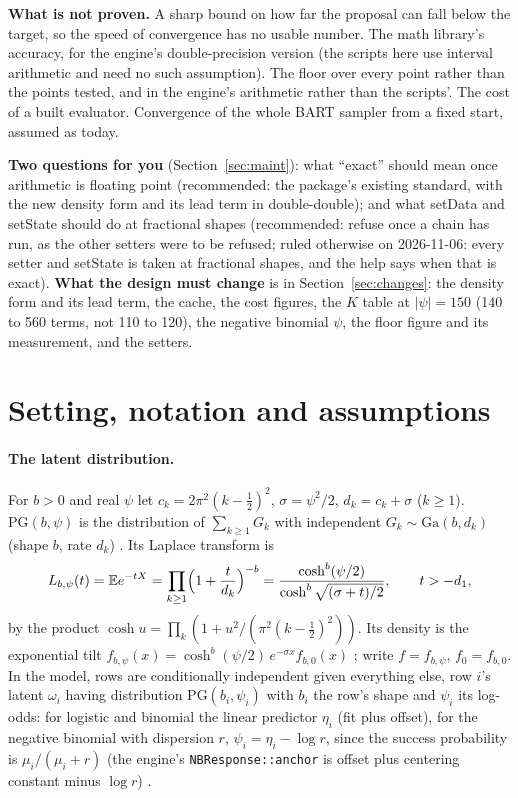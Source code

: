 \documentclass[11pt]{article}
\theoremstyle{definition}
\newcommand{\PG}{\mathrm{PG}}
\newcommand{\Ga}{\mathrm{Ga}}
\newcommand{\E}{\mathbb{E}}
\newcommand{\fz}{f_0}
\begin{document}
\textbf{What is not proven.} A sharp bound on how far the proposal can fall below the target, so the speed of
convergence has no usable number. The math library's accuracy, for the engine's double-precision version (the
scripts here use interval arithmetic and need no such assumption). The floor over every point rather than the
points tested, and in the engine's arithmetic rather than the scripts'. The cost of a built evaluator. Convergence
of the whole BART sampler from a fixed start, assumed as today.

\textbf{Two questions for you} (Section~\ref{sec:maint}): what ``exact'' should mean once arithmetic is floating
point (recommended: the package's existing standard, with the new density form and its lead term in
double-double); and what setData and setState should do at fractional shapes (recommended: refuse once a chain has
run, as the other setters were to be refused; ruled otherwise on 2026-11-06: every setter and setState is taken at
fractional shapes, and the help says when that is exact). \textbf{What the design must change} is in Section~\ref{sec:changes}: the
density form and its lead term, the cache, the cost figures, the $K$ table at $|\psi|=150$ (140 to 560 terms, not
110 to 120), the negative binomial $\psi$, the floor figure and its measurement, and the setters.

\newpage
\tableofcontents
\newpage

\section{Setting, notation and assumptions}\label{sec:setting}

\paragraph{The latent distribution.} For $b>0$ and real $\psi$ let $c_k=2\pi^2(k-\tfrac12)^2$,
$\sigma=\psi^2/2$, $d_k=c_k+\sigma$ ($k\ge1$). $\PG(b,\psi)$ is the distribution of $\sum_{k\ge1}G_k$ with
independent $G_k\sim\Ga(b,d_k)$ (shape $b$, rate $d_k$) \cite[eq.~(1) and Thm.~1]{psw}. Its Laplace transform is
\begin{equation}\label{eq:lt}
  L_{b,\psi}(t)=\E e^{-tX}=\prod_{k\ge1}\Bigl(1+\frac t{d_k}\Bigr)^{-b}
  =\frac{\cosh^b(\psi/2)}{\cosh^b\sqrt{(\sigma+t)/2}},\qquad t>-d_1,
\end{equation}
by the product $\cosh u=\prod_k(1+u^2/(\pi^2(k-\frac12)^2))$. Its density is the exponential tilt
$f_{b,\psi}(x)=\cosh^b(\psi/2)\,e^{-\sigma x}f_{b,0}(x)$ \cite[Sec.~2.3 and Thm.~1]{psw}; write $f=f_{b,\psi}$, $\fz=f_{b,0}$.
In the model, rows are conditionally independent given everything else, row $i$'s latent $\omega_i$ having
distribution $\PG(b_i,\psi_i)$ with $b_i$ the row's shape and $\psi_i$ its log-odds: for logistic and binomial
the linear predictor $\eta_i$ (fit plus offset), for the negative binomial with dispersion $r$, $\psi_i=\eta_i-\log
r$, since the success probability is $\mu_i/(\mu_i+r)$ (the engine's \texttt{NBResponse::anchor} is offset plus
centering constant minus $\log r$) \cite[Sec.~3 and Thm.~1]{psw}.
\end{document}
